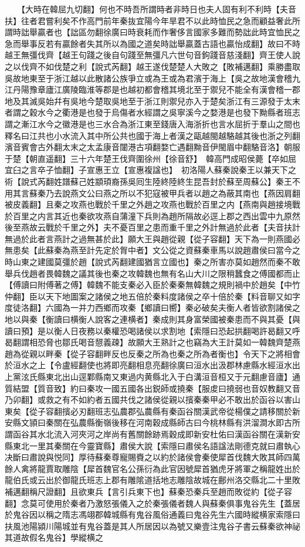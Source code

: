 　　【大時在韓屈九切翻】何也不時吾所謂時者非時日也夫人固有利不利時【夫音扶】往者君嘗利矣不作高門前年秦抜宜陽今年旱君不以此時恤民之急而顧益奢此所謂時詘舉贏者也【詘區勿翻徐廣曰時衰耗而作奢侈言國家多難而勢詘此時宜恤民之急而舉事反若有贏餘者失其所以為國之道矣時詘舉贏蓋古語也贏怡成翻】故曰不時　越王無彊伐齊【越王句踐之後自句踐至無彊凡六世句音鉤踐音慈淺翻】齊王使人說之以伐齊不如伐楚之利【說式芮翻】越王遂伐楚楚人大敗之【敗補邁翻】乘勝盡取吳故地東至于浙江越以此散諸公族爭立或為王或為君濱于海上【吳之故地漢會稽九江丹陽豫章廬江廣陵臨淮等郡是也越初都會稽其境北至于禦兒不能全有漢會稽一郡地及其滅吳始幷有吳地今楚取吳地至于浙江則禦兒亦入于楚矣浙江有三源發于太末者謂之穀水今之衢港是也發于烏傷者水經謂之吳寧溪今之婺港是也發下黝縣者班志謂之漸江水今之徽港是也三水合為浙江東至錢唐入海浙折也言水屈折于羣山之間也釋名曰江共也小水流入其中所公共也國于海上者漢之甌越閩越駱越其後也浙之列翻濱音賓會古外翻太末之太孟康音闥港古項翻婺亡遇翻黝音伊閩眉中翻駱音洛】朝服于楚【朝直遥翻】三十六年楚王伐齊圍徐州【徐音舒】　韓高門成昭侯薨【卒如屈宜臼之言卒子恤翻】子宣惠王立【宣惠複諡也】　初洛陽人蘇秦說秦王以兼天下之術【說式芮翻姓譜蘇己姓顓頊裔孫吳囘生陸終陸終生昆吾封於蘇至周蘇公】秦王不用其言蘇秦乃去說燕文公曰燕之所以不犯寇被甲兵者以趙之為蔽其南也【燕因肩翻被皮義翻】且秦之攻燕也戰於千里之外趙之攻燕也戰於百里之内【燕南與趙接境戰於百里之内言其近也秦欲攻燕自蒲潼下兵則為趙所隔故必逕上郡之西出雲中九原然後至燕故云戰於千里之外】夫不憂百里之患而重千里之外計無過於此者【夫音扶計無過於此者言燕計之過無甚於此】願大王與趙從親【從子容翻】天下為一則燕國必無患矣【此蘇秦為燕至計先定於胷中者】文公從之資蘇秦車馬以說趙肅侯曰當今之時山東之建國莫彊於趙【說式芮翻建國猶言立國也】秦之所害亦莫如趙然而秦不敢舉兵伐趙者畏韓魏之議其後也秦之攻韓魏也無有名山大川之限稍蠶食之傅國都而止【傅讀曰附傅著之傅】韓魏不能支秦必入臣於秦秦無韓魏之規則禍中於趙矣【中竹仲翻】臣以天下地圖案之諸侯之地五倍於秦料度諸侯之卒十倍於秦【料音聊又如字度徒洛翻】六國為一并力西鄉而攻秦【鄉讀曰嚮】秦必破矣夫衡人者皆欲割諸侯之地以與秦【衡讀曰横衡人說客之連横者】秦成則其身富榮國被秦患而不與其憂【與讀曰預】是以衡人日夜務以秦權恐喝諸侯以求割地【索隱曰恐起拱翻喝許曷翻又呼曷翻謂相恐脅也鄒氏喝音憇義疎】故願大王熟計之也竊為大王計莫如一韓魏齊楚燕趙為從親以畔秦【從子容翻畔反也反秦之所為也秦之所為者衡也】令天下之將相會於洹水之上【令盧經翻使也將即亮翻相息亮翻徐廣曰洹水出汲郡林慮縣水經洹水出上黨泫氏縣東北出山逕鄴縣南又東過内黄縣北入于白溝洹音桓又于元翻慮音廬】通質結盟【質音致】約曰秦攻一國五國各出鋭師或撓秦【服䖍曰撓弱也音奴教翻又音乃卯翻】或救之有不如約者五國共伐之諸侯從親以擯秦秦甲必不敢出於函谷以害山東矣【從子容翻擯必刃翻班志弘農郡弘農縣有秦函谷關漢武帝從楊僕之請移關於新安縣文頴曰秦關在弘農縣衡嶺後移在河南穀成縣師古曰今桃林縣有洪溜澗水即古所謂函谷其水北流入河夾河之岸尚有舊關餘跡焉穀成即新安杜佑曰漢函谷關在漢新安縣東北一里其秦關在今靈寶縣】肅侯大說【索隱曰肅侯名語諡法剛德克就曰肅執心决斷曰肅說與悦同】厚待蘇秦尊寵賜賚之以約於諸侯會秦使犀首伐魏大敗其師四萬餘人禽將龍賈取雕陰【犀首魏官名公孫衍為此官因號犀首猶虎牙將軍之稱龍姓出於龍伯氏或云出於御龍氏班志上郡有雕隂道括地志雕陰故城在鄜州洛交縣北二十里敗補邁翻稱尺證翻】且欲東兵【言引兵東下也】蘇秦恐秦兵至趙而敗從約【從子容翻】念莫可使用於秦者乃激怒張儀入之於秦張儀者魏人與蘇秦俱事鬼谷先生【蓋居於鬼谷因以稱之隋志馮翊郡韓城縣有鬼谷風俗通義曰鬼谷先生六國時縱横家索隱曰扶風池陽潁川陽城並有鬼谷蓋是其人所居因以為號又樂壹注鬼谷子書云蘇秦欲神祕其道故假名鬼谷】學縱横之